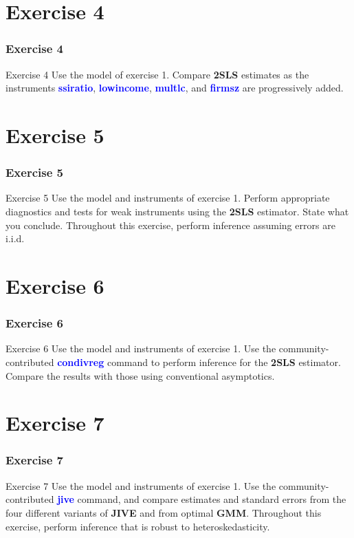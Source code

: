 \documentclass[10pt, aspectratio=169]{beamer}
\begin{document}
	\section{Exercise 4}
		\begin{frame}
			\frametitle{Exercise 4}
			\begin{block}{Exercise 4}
				Use the model of exercise 1. Compare \textbf{2SLS} estimates as the instruments
				\textcolor{blue}{\textbf{ssiratio}}, \textcolor{blue}{\textbf{lowincome}}, \textcolor{blue}{\textbf{multlc}}, and \textcolor{blue}{\textbf{firmsz}} are progressively added.
			\end{block}
		\end{frame}
	\section{Exercise 5}
		\begin{frame}
			\frametitle{Exercise 5}
			\begin{block}{Exercise 5}
				Use the model and instruments of exercise 1. Perform appropriate
				diagnostics and tests for weak instruments using the \textbf{2SLS} estimator. State
				what you conclude. Throughout this exercise, perform inference assuming
				errors are i.i.d.
			\end{block}
		\end{frame}
	\section{Exercise 6}
		\begin{frame}
			\frametitle{Exercise 6}
			\begin{block}{Exercise 6}
				Use the model and instruments of exercise 1. Use the community-contributed
				\textcolor{blue}{\textbf{condivreg}} command to perform inference for the \textbf{2SLS} estimator.
				Compare the results with those using conventional asymptotics.
			\end{block}
		\end{frame}
	\section{Exercise  7}
		\begin{frame}
			\frametitle{Exercise 7}
			\begin{block}{Exercise 7}
				Use the model and instruments of exercise 1. Use the community-contributed \textcolor{blue}{\textbf{jive}} command,
				and compare estimates and standard errors from
				the four different variants of \textbf{JIVE} and from optimal \textbf{GMM}. Throughout this
				exercise, perform inference that is robust to heteroskedasticity.
			\end{block}
		\end{frame}
\end{document}
